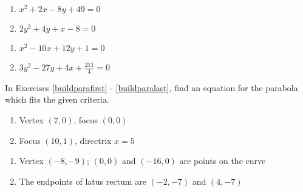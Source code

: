 \begin{multicols}{2}
\begin{enumerate}
\setcounter{enumi}{\value{HW}}

\item $x^2 + 2x - 8y + 49 = 0$
\item $2y^2 + 4y +x - 8 = 0$

\setcounter{HW}{\value{enumi}}
\end{enumerate}
\end{multicols}

\begin{multicols}{2}
\begin{enumerate}
\setcounter{enumi}{\value{HW}}

\item $x^2-10x+12y+1=0$
\item  $3y^2-27y+4x+\frac{211}{4} = 0$ \label{stdfrmparabolalast}

\setcounter{HW}{\value{enumi}}
\end{enumerate}
\end{multicols}


In Exercises \ref{buildparafirst} - \ref{buildparalast}, find an equation for the parabola which fits the given criteria.

\begin{multicols}{2}
\begin{enumerate}
\setcounter{enumi}{\value{HW}}

\item Vertex $(7, 0)$, focus $(0, 0)$ \label{buildparafirst}
\item Focus $(10, 1)$, directrix $x = 5$


\setcounter{HW}{\value{enumi}}
\end{enumerate}
\end{multicols}

\begin{multicols}{2}
\begin{enumerate}
\setcounter{enumi}{\value{HW}}


\item Vertex $(-8, -9)$; $(0, 0)$ and $(-16, 0)$ are points on the curve
\item The endpoints of latus rectum are $(-2, -7)$ and $(4, -7)$ \label{buildparalast}

\setcounter{HW}{\value{enumi}}
\end{enumerate}
\end{multicols}

